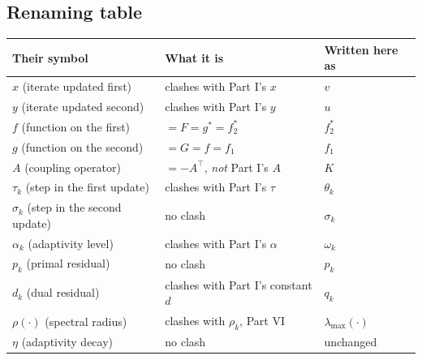 \documentclass[11pt]{article}
\begin{document}
\subsection*{Renaming table}
\begin{center}
\begin{tabular}{@{}lll@{}}
\toprule
Their symbol & What it is & Written here as\\
\midrule
$x$ (iterate updated first) & clashes with Part I's $x$ & $v$\\
$y$ (iterate updated second) & clashes with Part I's $y$ & $u$\\
$f$ (function on the first) & $=F=g^*=f_2^*$ & $f_2^*$\\
$g$ (function on the second) & $=G=f=f_1$ & $f_1$\\
$A$ (coupling operator) & $=-A^\top$, \emph{not} Part I's $A$ & $K$\\
$\tau_k$ (step in the first update) & clashes with Part I's $\tau$ & $\theta_k$\\
$\sigma_k$ (step in the second update) & no clash & $\sigma_k$\\
$\alpha_k$ (adaptivity level) & clashes with Part I's $\alpha$ & $\omega_k$\\
$p_k$ (primal residual) & no clash & $p_k$\\
$d_k$ (dual residual) & clashes with Part I's constant $d$ & $q_k$\\
$\rho(\cdot)$ (spectral radius) & clashes with $\rho_k$, Part VI & $\lambda_{\max}(\cdot)$\\
$\eta$ (adaptivity decay) & no clash & unchanged\\
\bottomrule
\end{tabular}
\end{center}
\end{document}
